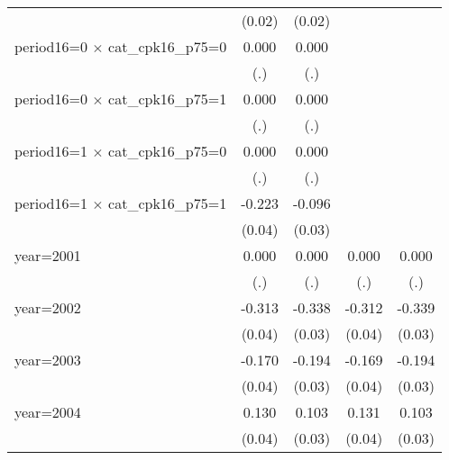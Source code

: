 {\begin{tabular}{l*{4}{c}}
                    &      (0.02)         &      (0.02)         &                     &                     \\
period16=0 $\times$ cat\_cpk16\_p75=0&       0.000         &       0.000         &                     &                     \\
                    &         (.)         &         (.)         &                     &                     \\
period16=0 $\times$ cat\_cpk16\_p75=1&       0.000         &       0.000         &                     &                     \\
                    &         (.)         &         (.)         &                     &                     \\
period16=1 $\times$ cat\_cpk16\_p75=0&       0.000         &       0.000         &                     &                     \\
                    &         (.)         &         (.)         &                     &                     \\
period16=1 $\times$ cat\_cpk16\_p75=1&      -0.223\sym{***}&      -0.096\sym{**} &                     &                     \\
                    &      (0.04)         &      (0.03)         &                     &                     \\
year=2001           &       0.000         &       0.000         &       0.000         &       0.000         \\
                    &         (.)         &         (.)         &         (.)         &         (.)         \\
year=2002           &      -0.313\sym{***}&      -0.338\sym{***}&      -0.312\sym{***}&      -0.339\sym{***}\\
                    &      (0.04)         &      (0.03)         &      (0.04)         &      (0.03)         \\
year=2003           &      -0.170\sym{***}&      -0.194\sym{***}&      -0.169\sym{***}&      -0.194\sym{***}\\
                    &      (0.04)         &      (0.03)         &      (0.04)         &      (0.03)         \\
year=2004           &       0.130\sym{**} &       0.103\sym{**} &       0.131\sym{**} &       0.103\sym{**} \\
                    &      (0.04)         &      (0.03)         &      (0.04)         &      (0.03)         \\

\end{tabular}}

